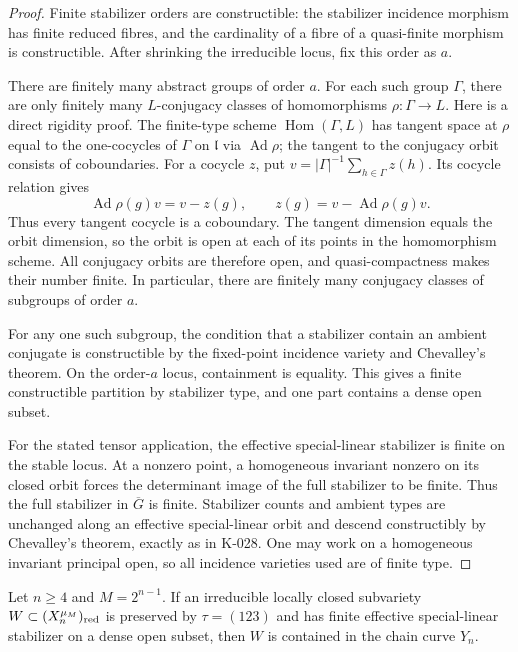 \begin{proof}
Finite stabilizer orders are constructible: the stabilizer
incidence morphism has finite reduced fibres, and the cardinality
of a fibre of a quasi-finite morphism is constructible.  After
shrinking the irreducible locus, fix this order as $a$.

There are finitely many abstract groups of order $a$.  For each
such group $\Gamma$, there are only finitely many $L$-conjugacy
classes of homomorphisms $\rho:\Gamma\to L$.  Here is a direct
rigidity proof.  The finite-type scheme $\operatorname{Hom}(\Gamma,L)$
has tangent space at $\rho$ equal to the one-cocycles of $\Gamma$
on $\mathfrak l$ via $\operatorname{Ad}\rho$; the tangent to the
conjugacy orbit consists of coboundaries.  For a cocycle $z$, put
$v=|\Gamma|^{-1}\sum_{h\in\Gamma}z(h)$.  Its cocycle relation gives
\[
             \operatorname{Ad}\rho(g)v=v-z(g),
             \qquad z(g)=v-\operatorname{Ad}\rho(g)v.
\]
Thus every tangent cocycle is a coboundary.  The tangent dimension
equals the orbit dimension, so the orbit is open at each of its
points in the homomorphism scheme.  All conjugacy orbits are
therefore open, and quasi-compactness makes their number finite.
In particular, there are finitely many conjugacy classes of
subgroups of order $a$.

For any one such subgroup, the condition that a stabilizer contain
an ambient conjugate is constructible by the fixed-point incidence
variety and Chevalley's theorem.  On the order-$a$ locus, containment
is equality.  This gives a finite constructible partition by
stabilizer type, and one part contains a dense open subset.

For the stated tensor application, the effective special-linear
stabilizer is finite on the stable locus.  At a nonzero point, a
homogeneous invariant nonzero on its closed orbit forces the
determinant image of the full stabilizer to be finite.  Thus the
full stabilizer in $\overline G$ is finite.  Stabilizer counts and
ambient types are unchanged along an effective special-linear
orbit and descend constructibly by Chevalley's theorem, exactly
as in K-028.  One may work on a homogeneous invariant principal
open, so all incidence varieties used are of finite type.
\end{proof}

\begin{theorem}[K-030c]
Let $n\ge4$ and $M=2^{n-1}$.  If an irreducible locally closed
subvariety $W\subset (X_n^{\mu_M})_{\rm red}$ is preserved by
$\tau=(123)$ and has finite effective special-linear stabilizer
on a dense open subset, then $W$ is contained in the chain
curve $Y_n$.
\end{theorem}

